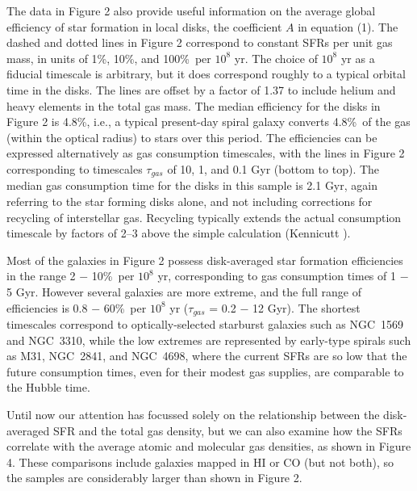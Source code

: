 The data in Figure 2 also provide useful information on the
average global efficiency of star formation in local disks, the
coefficient $A$ in equation (1).  The dashed and dotted lines in 
Figure 2 correspond to constant SFRs per unit gas mass, in units
of 1\%, 10\%, and 100\%\ per $10^8$ yr.  The choice of $10^8$ yr
as a fiducial timescale is arbitrary, but it does correspond roughly to 
a typical orbital time in the disks.  The lines are offset by
a factor of 1.37 to include helium and heavy elements in the 
total gas mass.  
The median efficiency for the disks in Figure 2 is 4.8\%, 
i.e., a typical present-day spiral galaxy converts 4.8\%\ of
the gas (within the optical radius) to stars over this period.  
The efficiencies 
can be expressed alternatively as gas consumption timescales, with
the lines in Figure 2 corresponding to timescales $\tau_{gas}$ of 10, 1, 
and 0.1 Gyr
(bottom to top).  The median gas consumption time for the disks in
this sample is 2.1 Gyr, again referring to the star forming disks alone,
and not including corrections for recycling of interstellar gas.
Recycling typically extends the actual consumption timescale 
by factors of 2--3 above the simple calculation (Kennicutt ).

Most of the galaxies in Figure 2 possess disk-averaged star formation
efficiencies in the range 2 $-$ 10\%\ per $10^8$ yr, corresponding to
gas consumption times of 1 $-$ 5 Gyr.  However several galaxies are more
extreme, and the full range of efficiencies is 0.8 $-$ 60\%\ per $10^8$ yr 
($\tau_{gas}$ = 0.2 $-$ 12 Gyr).  The shortest timescales correspond
to optically-selected starburst galaxies such as NGC~1569 and NGC~3310, 
while the low extremes are represented by early-type spirals such as
M31, NGC~2841, and NGC~4698, where the current SFRs are so low that
the future consumption times, even for their modest gas supplies,
are comparable to the Hubble time. 

Until now our attention has focussed solely on the relationship
between the disk-averaged SFR and the total gas density, but we can
also examine how the SFRs correlate with the average atomic and molecular gas
densities, as shown in Figure 4.  These comparisons include
galaxies mapped in HI or CO (but not both), so the samples are considerably
larger than shown in Figure 2.  

